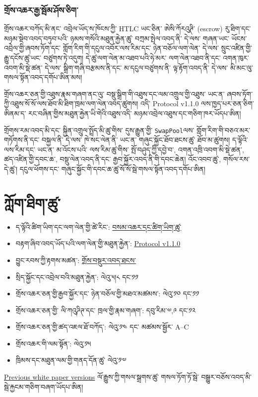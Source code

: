 \documentclass[11pt]{article}
\begin{document}
\subsubsection*{གྲོས་འཆར་རྒྱ་སྦོམ་ཤོས་ཅིག་}

གྲོས་འཆར་བཀོད་མི་ནང་ འབྲེལ་ཡོད་ས་ཁོངས་ཀྱི་ HTLC ཡང་ཅིན་ ཨེསི་ཀོརའུཊི་ (escrow) རུ་ཐིག་དང་ མཉམ་སྡེབ་འབད་བཏུབ་པའི་ ཉམས་གསོའི་མཐུན་རྐྱེན་ཚུ་ བཀྲམ་སྤེལ་འབད་ནི་ དེ་ལས་ གཞན་ཡང་ ཡོངས་འབྲེལ་གྱི་ཞབས་ཏོག་དང་ གློག་རིག་གི་དངུལ་འབོར་ལས་རིམ་དང་ ཉེན་བཅོལ་ལག་ལེན་ དེ་ལས་ སྲུང་འཛིན་གྱི་རྒྱུ་དངོས་ཚུ་ཡང་ བཙུགས་ཏེ་འདུག། དེ་ཚུ་ལག་ལེན་མ་འཐབ་པའི་ཧེ་མར་ ལག་ལེན་འཐབ་ནི་དང་ འགན་ཁུར་འབག་མི་སྡེ་ཚན་ དེ་ལས་ སྒྲིག་གཞི་བརྩམས་ནི་དང་ མ་དངུལ་བཙུགས་ནི་ ལྟ་རྟོག་འབད་ནི་ དེ་ལས་ མི་མང་ལུ་ གསལ་སྟོན་འབད་དགོཔ་ཨིན་མས།

གྲོས་འཆར་ཅན་གྱི་འཐུས་རྣམ་གཞག་ནང་ལུ་ བསྡུ་སྒྲིག་གི་འཐུས་དང་ལམ་འགྲུལ་གྱི་འཐུས་ ཡང་ན་ ཞབས་ཏོག་ཀྱི་འཐུས་སོ་སོ་ལས་ཐོབ་མི་ཐིག་ཁྲམ་ལག་ལེན་འབད་ཚུགས། འདི་ Protocol v1.1.0 ལས་ཁྱད་པར་ཅན་ཅིག་ཨིནམ་ད་ རང་བཞིན་གྱིས་མཐུན་རྐྱེན་ཡི་གེའི་འཐུས་འདི་ མཉམ་འབྲེལ་འཐུས་དང་གཅིག་ཁར་ཡོདཔ་ཨིན།

གྲོགས་རམ་འབད་མི་དང་ སྐྱིན་འགྲུལ་སྤྲོད་མི་ཚུ་གིས་ དུས་རྒྱུན་གྱི་ \texttt{SwapPool}ལས་ གློག་རིག་གི་བཅའ་མར་གཏོགས་ནི་དང་ བསྐྱལ་ནི་ དེ་ལས་ ཁེ་སང་ལེན་ནི་ ཡང་ན་ གཞུང་སྐྱོང་ཐོབ་ཐངས་ཚུ་ ཐོབ་མ་ཚུགས། ད་ལྟོའི་ལས་རིམ་དང་ ཡང་ན་ མ་འོངས་པའི་ ལས་རིམ་ཚུ་གིས་ སྤོ་བཤུད་ཀྱི་དབྱེ་བ་, འགན་འཁྲི་འབག་མི་སྡེ་ཚན་, ཚད་འཛིན་གྱི་དབང་ཆ་, བསྡུ་ལེན་འབད་ནི་དང་ རྒྱབ་སྐྱོར་འབད་ནི་གི་དབང་ཆེན། འོང་འབབ་ཚུ་, གསོལ་རས་དེ་ཚུ་། དངུལ་ཕོགས་དང་ གཞུང་སྐྱོང་གི་དབང་ཆ་ཚུ་སོ་སོ་སྦེ་གསལ་སྟོན་འབད་དགོཔ་ཨིན།

\section*{ཀློག་ཐིག་ཚུ་}

\begin{itemize}[leftmargin=*]
\item ད་ལྟོའི་ཚིག་ཡིག་དང་ལག་ལེན་གྱི་ཚེ་རིང་: \href{https://docs.cosmolocal.credit/dz/introduction/concepts}{བསམ་འཆར་དང་ཚིག་ཡིག་ཚུ་}
\item བརྟག་ཞིབ་འབད་ཡོད་པའི་ལག་ལེན་གྱི་མཐུན་རྐྱེན་: \href{https://docs.cosmolocal.credit/dz/protocol/overview}{Protocol v1.1.0}
\item བྱུང་རབས་ཀྱི་རྟགས་མཚན་: \href{https://docs.cosmolocal.credit/dz/white-paper/executive-summary}{གྲོས་བསྡུར་འབད་ཐངས་}
\item སྲིད་སྐྱོང་དང་འབྲེལ་བའི་མཐུན་རྐྱེན་: ལེའུ་༥།༨ དང་༡༡
\item གྲོས་འཆར་ཅན་གྱི་རྒྱབ་སྐྱོར་དང་ ཉེན་བཅོལ་གྱི་མཐའ་མཚམས་: ལེའུ་༡༠ དང་༡༡
\item གྲོས་འཆར་ཅན་གྱི་ ལི་ཀའུཌིཊ་དང་ ཁྲལ་གྱི་རྣམ་གཞག་: དབུ་རིམ་༧,༩ དང་༡༢
\item གྲོས་འཆར་ཅན་གྱི་ཚད་འཇལ་ཐོ་བཀོད་: ལེའུ་༡༤ དང་ མཚམས་སྦྱོར་ A--C
\item གྲོས་འཆར་གི་ལམ་སྟོན་: ལེའུ་༡༥
\item ཁྲིམས་དང་མཐུན་ལམ་གྱི་གནད་དོན་ཚུ་ ལེའུ་༡༧
\end{itemize}
\href{https://docs.cosmolocal.credit/dz/white-paper/archive}{Previous white paper versions} ལོ་རྒྱུས་ཀྱི་གསལ་སྒྲགས་ཚུ་ གསལ་ཏོག་ཏོ་སྦེ་ བསྒྱུར་བཅོས་འབད་མི་སྦེ་རྐྱངམ་གཅིག་བཞག་ཡོདཔ་ཨིན།
\end{document}
